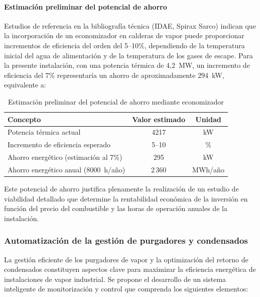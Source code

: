 \paragraph{Estimación preliminar del potencial de ahorro}

Estudios de referencia en la bibliografía técnica (IDAE, Spirax Sarco) indican que la incorporación de un economizador en calderas de vapor puede proporcionar incrementos de eficiencia del orden del 5--10\%, dependiendo de la temperatura inicial del agua de alimentación y de la temperatura de los gases de escape. Para la presente instalación, con una potencia térmica de 4,2~MW, un incremento de eficiencia del 7\% representaría un ahorro de aproximadamente 294~kW, equivalente a:

\begin{table}[H]
	\centering
	\caption{Estimación preliminar del potencial de ahorro mediante economizador}
	\label{tab:trabajo-futuro-economizador-ahorro}
	\begin{tabular}{lcc}
		\toprule
		\textbf{Concepto}                     & \textbf{Valor estimado} & \textbf{Unidad} \\
		\midrule
		Potencia térmica actual               & 4217                    & kW              \\
		Incremento de eficiencia esperado     & 5--10                   & \%              \\
		Ahorro energético (estimación al 7\%) & 295                     & kW              \\
		Ahorro energético anual (8000~h/año)  & 2\,360                  & MWh/año         \\
		\bottomrule
	\end{tabular}
\end{table}

Este potencial de ahorro justifica plenamente la realización de un estudio de viabilidad detallado que determine la rentabilidad económica de la inversión en función del precio del combustible y las horas de operación anuales de la instalación.

\subsubsection{Automatización de la gestión de purgadores y condensados}
\label{subsubsec:trabajo-futuro-purgadores}

La gestión eficiente de los purgadores de vapor y la optimización del retorno de condensados constituyen aspectos clave para maximizar la eficiencia energética de instalaciones de vapor industrial. Se propone el desarrollo de un sistema inteligente de monitorización y control que comprenda los siguientes elementos:

